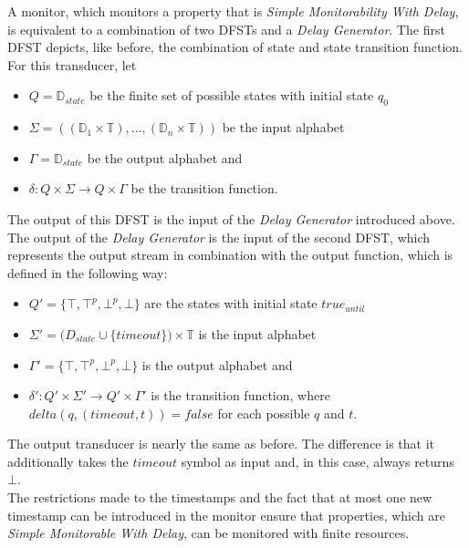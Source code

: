 	
		A monitor, which monitors a property that is \textit{Simple Monitorability With Delay}, is equivalent to a combination of two DFSTs and a \textit{Delay Generator}. The first DFST depicts, like before, the combination of state and state transition function. For this transducer, let
		\begin{itemize}
			\item
			$Q=\mathbb{D}_{state}$ be the finite set of possible states with initial state $q_0$
			\item
			$\Sigma=((\mathbb{D}_1\times \mathbb{T}),...,(\mathbb{D}_n\times \mathbb{T}))$ be the input alphabet
			\item
			$\Gamma = \mathbb D_{state}$ be the output alphabet and
			\item
			$\delta: Q\times \Sigma\rightarrow Q\times\Gamma$ be the transition function.
		\end{itemize}
		The output of this DFST is the input of the \textit{Delay Generator} introduced above. The output of the \textit{Delay Generator} is the input of the second DFST, which represents the output stream in combination with the output function, which is defined in the following way:
		\begin{itemize}
			\item
			$Q' = \{\top, \top^p, \bot^p, \bot\}$ are the states with initial state $true_{until}$
			\item
			$\Sigma'=\mathbb (D_{state}\cup\{timeout\})\times \mathbb{T}$ is the input alphabet
			\item
			$\Gamma' = \{\top, \top^p, \bot^p, \bot\}$ is the output alphabet and
			\item
			$\delta': Q'\times \Sigma'\rightarrow Q'\times\Gamma'$ is the transition function, where $delta(q, (timeout, t))=false$ for each possible $q$ and $t$.
		\end{itemize}
		The output transducer is nearly the same as before. The difference is that it additionally takes the $timeout$ symbol as input and, in this case, always returns $\bot$.\\
		
	The restrictions made to the timestamps and the fact that at most one new timestamp can be introduced in the monitor ensure that properties, which are \textit{Simple Monitorable With Delay}, can be monitored with finite resources.


